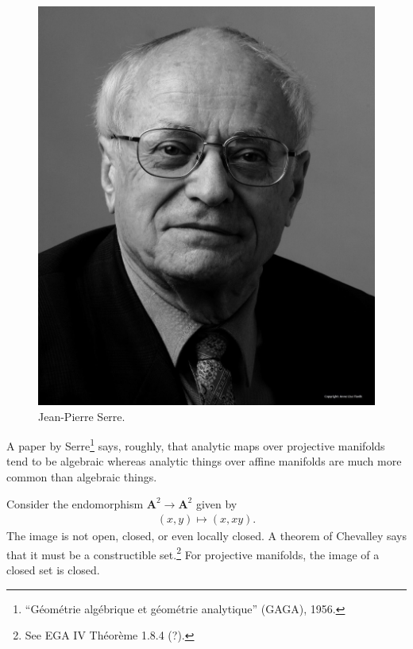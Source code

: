 \documentclass[11pt, oneside,margin=1in]{article}
\begin{document}
\begin{figure}
\begin{center}
\includegraphics[scale=0.8]{images/serre}
\caption{Jean-Pierre Serre.}
\end{center}
\end{figure}

\begin{remark}
	A paper by Serre\footnote{``G\'eom\'etrie alg\'ebrique et g\'eom\'etrie analytique'' (GAGA), 1956.} says, roughly, that analytic maps over projective manifolds tend to be algebraic whereas analytic things over affine manifolds are much more common than algebraic things.
\end{remark}


\begin{example}\label{}\text{}
Consider the endomorphism $\mathbf{A}^2\longrightarrow \mathbf{A}^2$ given by
\begin{align*}
	(x,y)\longmapsto  (x,xy).
\end{align*}
The image is not open, closed, or even locally closed. A theorem of Chevalley says that it must be a constructible set.\footnote{See EGA IV Th\'eor\`eme 1.8.4 (?).} For projective manifolds, the image of a closed set is closed.
\end{example}
\end{document}
